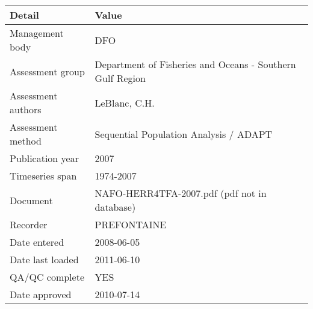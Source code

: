 \begin{table}[htb]
\centering
\begin{tabular}{lp{7cm}}
\toprule
Detail & Value \\
\midrule
Management body    & DFO                                                       \\
Assessment group   & Department of Fisheries and Oceans - Southern Gulf Region \\
Assessment authors & LeBlanc, C.H.                                             \\
Assessment method  & Sequential Population Analysis / ADAPT                    \\
Publication year   & 2007                                                      \\
Timeseries span    & 1974-2007                                                 \\
Document           & NAFO-HERR4TFA-2007.pdf (pdf not in database)              \\
Recorder           & PREFONTAINE                                               \\
Date entered       & 2008-06-05                                                \\
Date last loaded   & 2011-06-10                                                \\
QA/QC complete     & YES                                                       \\
Date approved      & 2010-07-14                                                \\
\bottomrule
\end{tabular}
\label{tab:assessdet}
\end{table}
